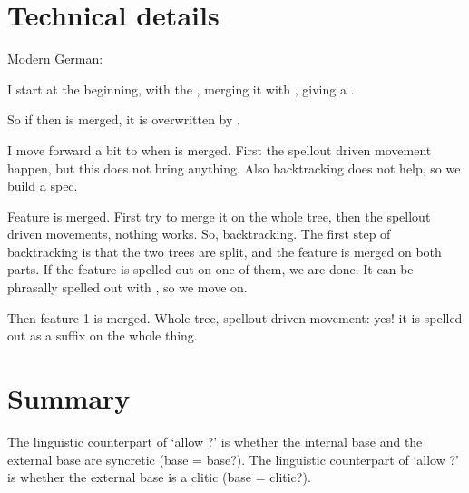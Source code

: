 \section{Technical details}

Modern German:

I start at the beginning, with the , merging it with , giving a .

So if then  is merged, it is overwritten by .

I move forward a bit to when  is merged. First the spellout driven movement happen, but this does not bring anything. Also backtracking does not help, so we build a spec.

Feature  is merged. First try to merge it on the whole tree, then the spellout driven movements, nothing works. So, backtracking. The first step of backtracking is that the two trees are split, and the feature is merged on both parts. If the feature is spelled out on one of them, we are done. It can be phrasally spelled out with , so we move on.

Then feature 1 is merged. Whole tree, spellout driven movement: yes! it is spelled out as a suffix on the whole thing.



\section{Summary}

The linguistic counterpart of `allow ?' is whether the internal base and the external base are syncretic (base = base?).
The linguistic counterpart of `allow ?' is whether the external base is a clitic (base = clitic?).


